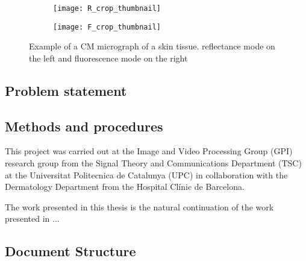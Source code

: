 \documentclass[../main.tex]{subfiles}
\begin{document}
\begin{figure}[h]
\centering
\begin{subfigure}{.5\textwidth}
  \centering
  \texttt{[image: R\_crop\_thumbnail]}
  \label{fig:R-example}
\end{subfigure}%
\begin{subfigure}{.5\textwidth}
  \centering
  \texttt{[image: F\_crop\_thumbnail]}
  \label{fig:F-example}
\end{subfigure}
\caption{Example of a CM micrograph of a skin tissue.
reflectance mode on the left and fluorescence mode on the right}
\label{fig:CM-example}
\end{figure}

\subsection{Problem statement}
\label{sec:problem-statement}



\lipsum

\subsection{Methods and procedures}
\label{sec:methods-and-procedures}
This project was carried out at the Image and Video Processing Group (GPI) research
group from the Signal Theory and Communications Department (TSC) at the Universitat
Politecnica de Catalunya (UPC) in collaboration with the Dermatology Department from
the Hospital Clínic de Barcelona.

The work presented in this thesis is the natural continuation of the work presented
in \cite{Combalia2019}...

\subsection{Document Structure}
\lipsum
\end{document}
